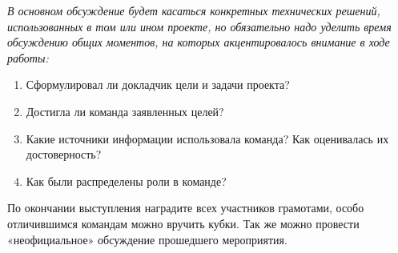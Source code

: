 {\slshape В основном обсуждение будет касаться конкретных технических решений, использованных в том или ином проекте, но обязательно надо уделить время обсуждению общих моментов, на которых акцентировалось внимание в ходе работы:
	
\begin{enumerate}
	\item  Сформулировал ли докладчик цели и задачи проекта?
	\item Достигла ли команда заявленных целей?
	\item Какие источники информации использовала команда? Как оценивалась их достоверность?
	\item Как были распределены роли в команде?
\end{enumerate}}

По окончании выступления наградите всех участников грамотами, особо отличившимся командам можно вручить кубки.  Так же можно провести «неофициальное» обсуждение прошедшего мероприятия.